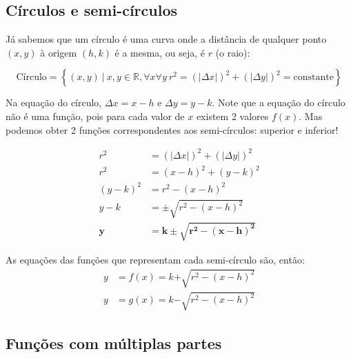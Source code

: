 \documentclass[pdftex, brazil, 12pt, twoside]{article}
\begin{document}
\subsection{Círculos e semi-círculos}
\label{analise-grafica-circulos}

Já sabemos que um círculo é uma curva onde a distância de qualquer ponto $(x,y)$
à origem $(h,k)$ é a mesma, ou seja, é $r$ (o raio):

\begin{equation}
  \text{Círculo} = \left\{(x,y)\ |\ x,y \in \mathbb{R}, \forall x \forall y\ r^2 = (|\Delta x|)^2 + (|\Delta y|)^2 = \text{constante}\right\}
\end{equation}

Na equação do círculo, $\Delta x = x - h$ e $\Delta y = y - k$. Note que a equação do círculo não é uma função, pois
para cada valor de $x$ existem 2 valores $f(x)$. Mas podemos obter 2 funções correspondentes
aos semi-círculos: superior e inferior!

\begin{equation}
  \begin{split}
    r^2 & = (|\Delta x|)^2 + (|\Delta y|)^2\\
    r^2 & = (x - h)^2 + (y - k)^2\\
    (y - k)^2 & = r^2 - (x - h)^2\\
    y - k & = \pm \sqrt{r^2 - (x - h)^2}\\
    \bm{y} & \bm{= k \pm \sqrt{r^2 - (x - h)^2}}
  \end{split}
\end{equation}

As equações das funções que representam cada semi-círculo são, então:
\begin{equation}
  \begin{split}
    y & = f(x) = k \bm{+} \sqrt{r^2 - (x - h)^2}\\
    y & = g(x) = k \bm{-} \sqrt{r^2 - (x - h)^2}
  \end{split}
\end{equation}


\subsection{Funções com múltiplas partes}
\label{analise-grafica-multipart}
\end{document}
